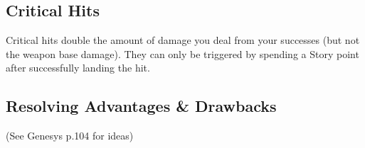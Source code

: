 

\subsection{Critical Hits} \label{critical hit}
Critical hits double the amount of damage you deal from your successes 
(but not the weapon base damage).
They can only be triggered by spending a Story point after successfully landing the hit. 






\subsection{Resolving Advantages \& Drawbacks}

(See Genesys p.104 for ideas)

